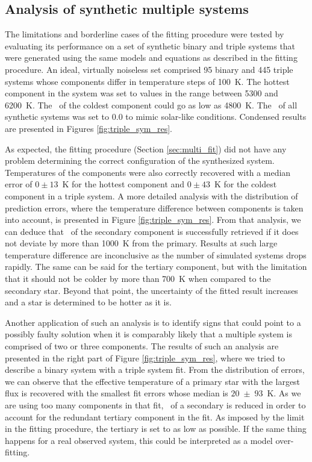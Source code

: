 \subsection{Analysis of synthetic multiple systems}
The limitations and borderline cases of the fitting procedure were tested by evaluating its performance on a set of synthetic binary and triple systems that were generated using the same models and equations as described in the fitting procedure. An ideal, virtually noiseless set comprised 95 binary and 445 triple systems whose components differ in temperature steps of 100~K. The hottest component in the system was set to values in the range between 5300 and 6200~K. The \Teff\ of the coldest component could go as low as 4800~K. The \Feh\ of all synthetic systems was set to $0.0$ to mimic solar-like conditions. Condensed results are presented in Figures \ref{fig:triple_sym_res}.

As expected, the fitting procedure (Section \ref{sec:multi_fit}) did not have any problem determining the correct configuration of the synthesized system. Temperatures of the components were also correctly recovered with a median error of $0 \pm 13$~K for the hottest component and  $0 \pm 43$~K for the coldest component in a triple system. A more detailed analysis with the distribution of prediction errors, where the temperature difference between components is taken into account, is presented in Figure \ref{fig:triple_sym_res}. From that analysis, we can deduce that \Teff\ of the secondary component is successfully retrieved if it does not deviate by more than 1000~K from the primary. Results at such large temperature difference are inconclusive as the number of simulated systems drops rapidly. The same can be said for the tertiary component, but with the limitation that it should not be colder by more than 700~K when compared to the secondary star. Beyond that point, the uncertainty of the fitted result increases and a star is determined to be hotter as it is.

Another application of such an analysis is to identify signs that could point to a possibly faulty solution when it is comparably likely that a multiple system is comprised of two or three components. The results of such an analysis are presented in the right part of Figure \ref{fig:triple_sym_res}, where we tried to describe a binary system with a triple system fit. From the distribution of errors, we can observe that the effective temperature of a primary star with the largest flux is recovered with the smallest fit errors whose median is $20$~$\pm$~$93$~K. As we are using too many components in that fit, \Teff\ of a secondary is reduced in order to account for the redundant tertiary component in the fit. As imposed by the limit in the fitting procedure, the tertiary  is set to as low as possible. If the same thing happens for a real observed system, this could be interpreted as a model over-fitting.

